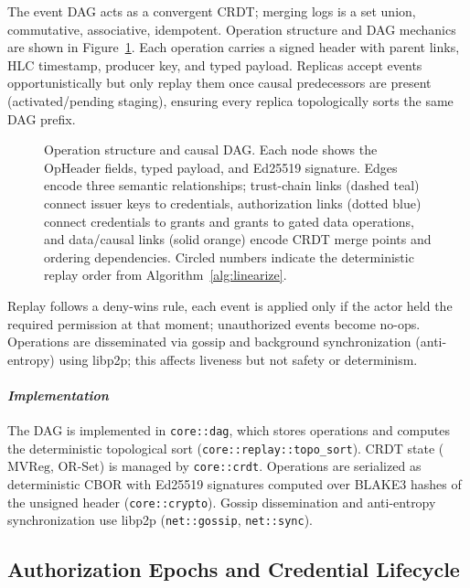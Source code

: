 \documentclass[10pt,journal,compsoc]{IEEEtran}
\begin{document}
The event DAG acts as a convergent CRDT; merging logs is a set union, commutative, associative, idempotent. Operation structure and DAG mechanics are shown in Figure~\ref{fig:dag-structure}. Each operation carries a signed header with parent links, HLC timestamp, producer key, and typed payload. Replicas accept events opportunistically but only replay them once causal predecessors are present (activated/pending staging), ensuring every replica topologically sorts the same DAG prefix.

\begin{figure}[!htbp]
\centering
\resizebox{\textwidth}{!}{}
\caption{Operation structure and causal DAG\@. Each node shows the OpHeader fields, typed payload, and Ed25519 signature. Edges encode three semantic relationships; trust-chain links (dashed teal) connect issuer keys to credentials, authorization links (dotted blue) connect credentials to grants and grants to gated data operations, and data/causal links (solid orange) encode CRDT merge points and ordering dependencies. Circled numbers indicate the deterministic replay order from Algorithm~\ref{alg:linearize}.}
\label{fig:dag-structure}
\end{figure}

Replay follows a deny-wins rule, each event is applied only if the actor held the required permission at that moment; unauthorized events become no-ops. Operations are disseminated via gossip and background synchronization (anti-entropy) using libp2p; this affects liveness but not safety or determinism.

\paragraph*{\textit{\textbf{Implementation}}} The DAG is implemented in \texttt{core::dag}, which stores operations and computes the deterministic topological sort (\texttt{core::replay::topo\_sort}). CRDT state ($\mathrm{MVReg}$, $\mathrm{OR\text{-}Set}$) is managed by \texttt{core::crdt}. Operations are serialized as deterministic CBOR with Ed25519 signatures computed over BLAKE3 hashes of the unsigned header (\texttt{core::crypto}). Gossip dissemination and anti-entropy synchronization use libp2p (\texttt{net::gossip}, \texttt{net::sync}).

\subsection{Authorization Epochs and Credential Lifecycle}
\end{document}
